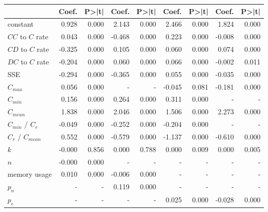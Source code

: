 \begin{tabular}{lrrrrrrrr}
\toprule
{} &  Coef. &  P>|t| &  Coef. &  P>|t| &  Coef. &  P>|t| &  Coef. &  P>|t| \\
\midrule
constant           &  0.928 &  0.000 &  2.143 &  0.000 &  2.466 &  0.000 &  1.824 &  0.000 \\
$CC$ to $C$ rate   &  0.043 &  0.000 & -0.468 &  0.000 &  0.223 &  0.000 & -0.008 &  0.000 \\
$CD$ to $C$ rate   & -0.325 &  0.000 &  0.105 &  0.000 &  0.060 &  0.000 &  0.074 &  0.000 \\
$DC$ to $C$ rate   & -0.204 &  0.000 &  0.060 &  0.000 &  0.066 &  0.000 & -0.002 &  0.011 \\
SSE                & -0.294 &  0.000 & -0.365 &  0.000 &  0.055 &  0.000 & -0.035 &  0.000 \\
$C_{max}$          &  0.056 &  0.000 &      - &      - & -0.045 &  0.081 & -0.181 &  0.000 \\
$C_{min}$          &  0.156 &  0.000 &  0.264 &  0.000 &  0.311 &  0.000 &      - &      - \\
$C_{mean}$         &  1.838 &  0.000 &  2.046 &  0.000 &  1.506 &  0.000 &  2.273 &  0.000 \\
$C_{min}$ / $C_r$  & -0.049 &  0.000 & -0.252 &  0.000 & -0.204 &  0.000 &      - &      - \\
$C_r$ / $C_{mean}$ &  0.552 &  0.000 & -0.579 &  0.000 & -1.137 &  0.000 & -0.610 &  0.000 \\
$k$                & -0.000 &  0.856 &  0.000 &  0.788 &  0.000 &  0.009 &  0.000 &  0.005 \\
$n$                & -0.000 &  0.000 &      - &      - &      - &      - &      - &      - \\
memory usage       &  0.010 &  0.000 & -0.006 &  0.000 &      - &      - &      - &      - \\
$p_n$              &      - &      - &  0.119 &  0.000 &      - &      - &      - &      - \\
$p_e$              &      - &      - &      - &      - &  0.025 &  0.000 & -0.028 &  0.000 \\
\bottomrule
\end{tabular}
